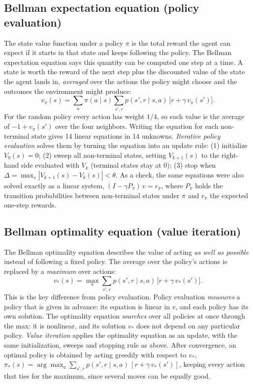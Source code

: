 \documentclass[11pt]{article}
\begin{document}
\subsection{Bellman expectation equation (policy evaluation)}
The state value function under a policy $\pi$ is the total reward the agent can expect if it starts in
that state and keeps following the policy. The Bellman expectation equation says this
quantity can be computed one step at a time. A state is worth the reward of the next step plus
the discounted value of the state the agent lands in, \emph{averaged} over the actions the
policy might choose and the outcomes the environment might produce:
\[
v_\pi(s) = \sum_a \pi(a \mid s) \sum_{s', r} p(s', r \mid s, a)\,\bigl[r + \gamma\, v_\pi(s')\bigr].
\]
For the random policy every action has
weight $1/4$, so each value is the average of $-1 + v_\pi(s')$ over the four neighbors.
Writing the equation for each non-terminal state gives 14 linear equations in 14 unknowns.
\emph{Iterative policy evaluation} solves them by turning the equation into an update rule:
(1) initialize $V_0(s) = 0$; (2) sweep all non-terminal states, setting $V_{k+1}(s)$ to the
right-hand side evaluated with $V_k$ (terminal states stay at $0$); (3) stop when
$\Delta = \max_s |V_{k+1}(s) - V_k(s)| < \theta$. As a check, the same equations were also solved exactly as a linear system,
$(I - \gamma P_\pi)\,v = r_\pi$, where $P_\pi$ holds the transition probabilities between
non-terminal states under $\pi$ and $r_\pi$ the expected one-step rewards.

\subsection{Bellman optimality equation (value iteration)}
The Bellman optimality equation describes the value of acting \emph{as well as possible}
instead of following a fixed policy. The average over the policy's actions is replaced by a
\emph{maximum} over actions:
\[
v_*(s) = \max_a \sum_{s', r} p(s', r \mid s, a)\,\bigl[r + \gamma\, v_*(s')\bigr].
\]
This is the key difference from policy evaluation. Policy evaluation \emph{measures} a policy
that is given in advance: its equation is linear in $v$, and each policy has its own
solution. The optimality equation \emph{searches} over all policies at once through the max:
it is nonlinear, and its solution $v_*$ does not depend on any particular policy. \emph{Value iteration} applies the optimality equation as an
update, with the same initialization, sweeps and stopping rule as above. After convergence, an
optimal policy is obtained by acting greedily with respect to $v_*$,
$\pi_*(s) = \arg\max_a \sum_{s', r} p(s', r \mid s, a)\,[r + \gamma\, v_*(s')]$, keeping every action that ties for the maximum, since several moves can be equally good.
\end{document}
